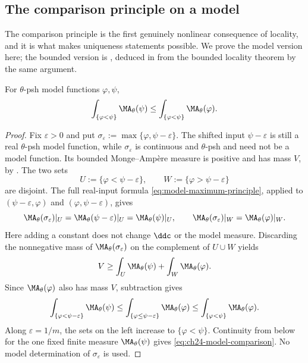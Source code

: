 \subsection{The comparison principle on a model}
\label{sec:ch24-model-comparison}

The comparison principle is the first genuinely nonlinear consequence of
locality, and it is what makes uniqueness statements possible.  We prove the
model version here; the bounded version is
, deduced in
 from the bounded locality theorem by the same
argument.

\begin{proposition}
\label{prop:ch24-model-comparison}
For \(\theta\)-psh model functions \(\varphi,\psi\),
\begin{equation}
\label{eq:ch24-model-comparison}
 \int_{\{\varphi<\psi\}}\MA_\theta(\psi)
 \leq
 \int_{\{\varphi<\psi\}}\MA_\theta(\varphi).
\end{equation}
\end{proposition}

\begin{proof}
Fix \(\varepsilon>0\) and put
\(\sigma_\varepsilon:=\max\{\varphi,\psi-\varepsilon\}\).
The shifted input \(\psi-\varepsilon\) is still a real \(\theta\)-psh
model function, while \(\sigma_\varepsilon\) is continuous and
\(\theta\)-psh and need not be a model function.  Its bounded
Monge--Amp\`ere measure is positive and has mass \(V\), by
.  The two sets
\[
 U:=\{\varphi<\psi-\varepsilon\},
 \qquad W:=\{\varphi>\psi-\varepsilon\}
\]
are disjoint.  The full real-input formula
\eqref{eq:model-maximum-principle}, applied to
\((\psi-\varepsilon,\varphi)\) and
\((\varphi,\psi-\varepsilon)\), gives
\[
 \MA_\theta(\sigma_\varepsilon)|_U
       =\MA_\theta(\psi-\varepsilon)|_U
       =\MA_\theta(\psi)|_U,
 \qquad
 \MA_\theta(\sigma_\varepsilon)|_W
       =\MA_\theta(\varphi)|_W.
\]
Here adding a constant does not change \(\ddc\) or the model measure.
Discarding the nonnegative mass of \(\MA_\theta(\sigma_\varepsilon)\)
on the complement of \(U\cup W\) yields
\[
 V\geq\int_U\MA_\theta(\psi)+\int_W\MA_\theta(\varphi).
\]
Since \(\MA_\theta(\varphi)\) also has mass \(V\), subtraction gives
\[
 \int_{\{\varphi<\psi-\varepsilon\}}\MA_\theta(\psi)
 \leq\int_{\{\varphi\leq\psi-\varepsilon\}}\MA_\theta(\varphi)
 \leq\int_{\{\varphi<\psi\}}\MA_\theta(\varphi).
\]
Along \(\varepsilon=1/m\), the sets on the left increase to
\(\{\varphi<\psi\}\).  Continuity from below for the one fixed finite
measure \(\MA_\theta(\psi)\) gives
\eqref{eq:ch24-model-comparison}.  No model determination of
\(\sigma_\varepsilon\) is used.
\end{proof}

